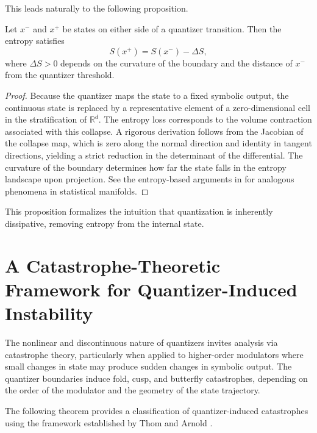 This leads naturally to the following proposition.

\begin{proposition}
Let $x^{-}$ and $x^{+}$ be states on either side of a quantizer transition. Then the entropy satisfies
\[
S(x^{+}) = S(x^{-}) - \Delta S,
\]
where $\Delta S > 0$ depends on the curvature of the boundary and the distance of $x^{-}$ from the quantizer threshold.
\end{proposition}

\begin{proof}
Because the quantizer maps the state to a fixed symbolic output, the continuous state is replaced by a representative element of a zero-dimensional cell in the stratification of $\mathbb{R}^{d}$. The entropy loss corresponds to the volume contraction associated with this collapse. A rigorous derivation follows from the Jacobian of the collapse map, which is zero along the normal direction and identity in tangent directions, yielding a strict reduction in the determinant of the differential. The curvature of the boundary determines how far the state falls in the entropy landscape upon projection. See the entropy-based arguments in \textcite{Amari2016InformationGeometry} for analogous phenomena in statistical manifolds.
\end{proof}

This proposition formalizes the intuition that quantization is inherently dissipative, removing entropy from the internal state.

\section{A Catastrophe-Theoretic Framework for Quantizer-Induced Instability}

The nonlinear and discontinuous nature of quantizers invites analysis via catastrophe theory, particularly when applied to higher-order modulators where small changes in state may produce sudden changes in symbolic output. The quantizer boundaries induce fold, cusp, and butterfly catastrophes, depending on the order of the modulator and the geometry of the state trajectory.

The following theorem provides a classification of quantizer-induced catastrophes using the framework established by Thom and Arnold \parencite{Arnold1989MathematicalMethods}.

